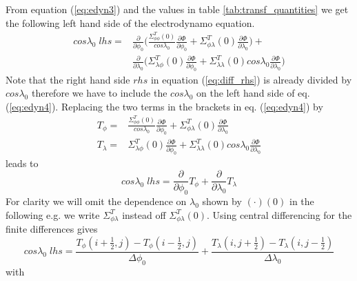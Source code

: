 %
From equation (\ref{eq:edyn3}) and the values in table \ref{tab:transf_quantities}
we get the following left hand side of the electrodynamo equation.
%
\begin{equation}
\begin{split}
 cos \lambda_0 \; lhs=  & \frac{\partial}{\partial \phi_0} 
    \bigl( \frac{\Sigma_{\phi \phi}^T(0)}{cos
   \lambda_0} \frac{\partial \Phi}{\partial \phi_0} + 
   \Sigma_{\phi \lambda}^T(0) \frac{\partial \Phi}{\partial \lambda_0} \bigr) + \\
    & \frac{\partial}
   {\partial  \lambda_0 } \bigl( \Sigma_{\lambda \phi}^T(0)
    \frac{\partial \Phi}{\partial \phi_0} + 
   \Sigma_{\lambda \lambda}^T(0) cos \lambda_0 
   \frac{\partial \Phi}{\partial \lambda_0} \bigr)
    \label{eq:edyn4}
\end{split}
\end{equation}
%
Note that the right hand side $rhs$ in equation (\ref{eq:diff_rhs}) is already divided
by $cos \lambda_0$ therefore we have to include the $cos \lambda_0$ on the left
hand side of eq. (\ref{eq:edyn4}). Replacing 
the two terms in the brackets in eq.  (\ref{eq:edyn4}) by
%
\begin{align}
 T_{\phi}=&  \frac{\Sigma_{\phi \phi}^T(0)}{cos
   \lambda_0} \frac{\partial \Phi}{\partial \phi_0} + 
   \Sigma_{\phi \lambda}^T(0) \frac{\partial \Phi}{\partial \lambda_0} \label{eq:tphi}\\
 T_{\lambda}=& \Sigma_{\lambda \phi}^T(0)
    \frac{\partial \Phi}{\partial \phi_0} + 
   \Sigma_{\lambda \lambda}^T(0) cos \lambda_0 
   \frac{\partial \Phi}{\partial \lambda_0} \label{eq:tlambda}
\end{align}
%
 leads to
%
\begin{equation}
 cos \lambda_0 \; lhs=  \frac{\partial}{\partial \phi_0} T_{\phi}  +
   \frac{\partial}{\partial  \lambda_0 } T_{\lambda}  \label{eq:edyn5}
\end{equation}
%
For clarity we will omit the dependence on $\lambda_0$ shown by
$(\cdot)(0)$ in the following e.g. we write $\Sigma_{\phi \lambda}^T$ instead off
$\Sigma_{\phi \lambda}^T(0)$. 
Using central differencing for the finite differences gives
%
\begin{equation}
 cos \lambda_0 \; lhs=  \frac{T_{\phi}(i+\frac{1}{2},j)-T_{\phi}(i-\frac{1}{2},j)}
 {\Delta \phi_0}   +
   \frac{ T_{\lambda}(i,j+\frac{1}{2})- T_{\lambda}(i,j-\frac{1}{2})}
   {\Delta  \lambda_0 } \label{eq:edyn6}
\end{equation}
%
with
%

